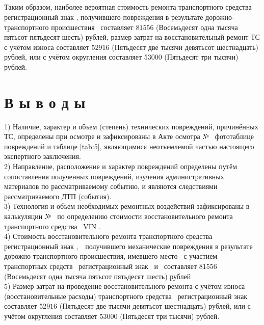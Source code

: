 \subparagraph{}Таким образом,  наиболее вероятная стоимость ремонта транспортного средства \tc\, регистрационный знак , получившего повреждения в результате дорожно-транспортного происшествия  \, составляет $81 556$ (Восемьдесят одна тысяча пятьсот пятьдесят шесть) рублей,  размер затрат на восстановительный ремонт ТС с учётом износа составляет  $ 52 916 $ (Пятьдесят две тысячи девятьсот шестнадцать) рублей, или с учётом округления составляет $ 53 000 $ (Пятьдесят три тысячи) рублей.
      

\section{В ы в о д ы}

1) Наличие, характер и объем (степень) технических повреждений, причинённых ТС, определены при осмотре и зафиксированы в Акте осмотра № \NomerDoc\,  фототаблице повреждений и таблице \ref{tab:5}, являющимися неотъемлемой частью настоящего экспертного заключения.\\[3mm]
    
2) Направление, расположение и характер повреждений определены путём сопоставления полученных повреждений, изучения административных материалов по рассматриваемому событию, и  являются  следствиями рассматриваемого ДТП (события).\\[3mm]
    
3) Технология и объем необходимых ремонтных воздействий зафиксированы в калькуляции № \NomerDoc\, по определению стоимости восстановительного ремонта транспортного средства \tc\, VIN  \vin. \\[3mm]
    
4)  Стоимость восстановительного ремонта  транспортного средства \tc\, регистрационный знак ,\, \, получившего механические повреждения в результате дорожно-транспортного происшествия, имевшего место \, с участием транспортных средств \, регистрационный знак \, и \tcb\, составляет $81 556$ (Восемьдесят одна тысяча пятьсот пятьдесят шесть) рублей\\[3mm]
    
5) Размер затрат на проведение восстановительного ремонта с учётом износа (восстановительные расходы) транспортного средства \tc\, регистрационный знак \grz\, составляет  $ 52 916 $ (Пятьдесят две тысячи девятьсот шестнадцать) рублей, или с учётом округления составляет $ 53 000 $ (Пятьдесят три тысячи) рублей.\\[3mm]
    
